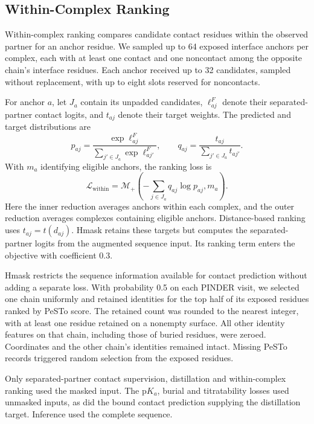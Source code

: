 \subsection{Within-Complex Ranking}
\label{app:jaxka-within-ranking}

Within-complex ranking compares candidate contact residues within the observed partner for an anchor residue. We sampled up to 64 exposed interface anchors per complex, each with at least one contact and one noncontact among the opposite chain's interface residues. Each anchor received up to 32 candidates, sampled without replacement, with up to eight slots reserved for noncontacts.

For anchor $a$, let $J_a$ contain its unpadded candidates, $\ell^F_{aj}$ denote their separated-partner contact logits, and $t_{aj}$ denote their target weights. The predicted and target distributions are
\begin{equation}
    p_{aj}=\frac{\exp\ell^F_{aj}}{\sum_{j'\in J_a}\exp\ell^F_{aj'}},
    \qquad
    q_{aj}=\frac{t_{aj}}{\sum_{j'\in J_a}t_{aj'}}.
    \label{eq:jaxka-ranking-distributions}
\end{equation}
With $m_a$ identifying eligible anchors, the ranking loss is
\begin{equation}
    \mathcal L_{\mathrm{within}}
    =\mathcal M_+\!\left(
    -\sum_{j\in J_a}q_{aj}\log p_{aj},m_a
    \right).
    \label{eq:jaxka-within-ranking}
\end{equation}
Here the inner reduction averages anchors within each complex, and the outer reduction averages complexes containing eligible anchors. Distance-based ranking uses $t_{aj}=t(d_{aj})$. Hmask retains these targets but computes the separated-partner logits from the augmented sequence input. Its ranking term enters the objective with coefficient 0.3.

Hmask restricts the sequence information available for contact prediction without adding a separate loss. With probability 0.5 on each PINDER visit, we selected one chain uniformly and retained identities for the top half of its exposed residues ranked by PeSTo score. The retained count was rounded to the nearest integer, with at least one residue retained on a nonempty surface. All other identity features on that chain, including those of buried residues, were zeroed. Coordinates and the other chain's identities remained intact. Missing PeSTo records triggered random selection from the exposed residues.

Only separated-partner contact supervision, distillation and within-complex ranking used the masked input. The $\mathrm{p}K_a$, burial and titratability losses used unmasked inputs, as did the bound contact prediction supplying the distillation target. Inference used the complete sequence.

